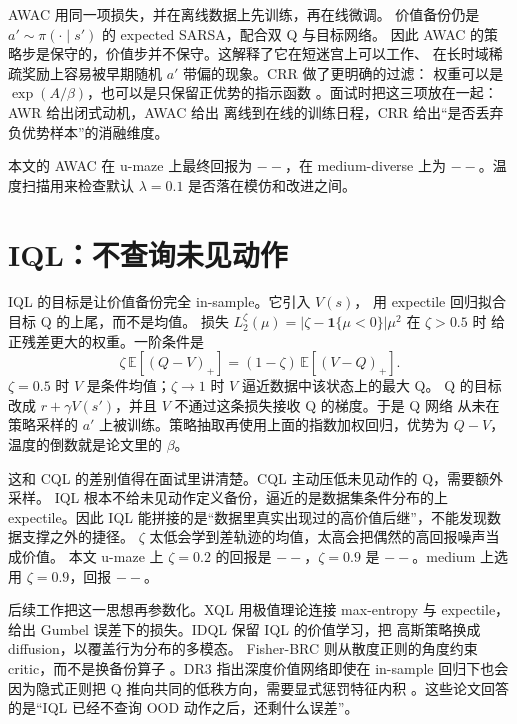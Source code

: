 \documentclass[10pt,twocolumn,a4paper]{ctexart}
\providecommand{\BestZeta}{0.9}
\providecommand{\IqlBestMediumMean}{--}
\providecommand{\AwacUmazeMean}{--}\providecommand{\AwacMediumMean}{--}
\providecommand{\IqlZAJUmazeMean}{--}\providecommand{\IqlZAJMediumMean}{--}
\providecommand{\IqlZACUmazeMean}{--}
\begin{document}
AWAC 用同一项损失，并在离线数据上先训练，再在线微调\citep{nair2020awac}。
价值备份仍是 $a'\sim\pi(\cdot\mid s')$ 的 expected SARSA，配合双 Q 与目标网络。
因此 AWAC 的策略步是保守的，价值步并不保守。这解释了它在短迷宫上可以工作、
在长时域稀疏奖励上容易被早期随机 $a'$ 带偏的现象。CRR 做了更明确的过滤：
权重可以是 $\exp(A/\beta)$，也可以是只保留正优势的指示函数
\citep{wang2020crr}。面试时把这三项放在一起：AWR 给出闭式动机，AWAC 给出
离线到在线的训练日程，CRR 给出“是否丢弃负优势样本”的消融维度。

本文的 AWAC 在 u-maze 上最终回报为 $\AwacUmazeMean$，在 medium-diverse 上为
$\AwacMediumMean$。温度扫描用来检查默认 $\lambda=0.1$ 是否落在模仿和改进之间。

\section{IQL：不查询未见动作}
IQL 的目标是让价值备份完全 in-sample\citep{kostrikov2022iql}。它引入 $V(s)$，
用 expectile 回归拟合目标 Q 的上尾，而不是均值\citep{newey1987expectile}。
损失 $L_2^{\zeta}(\mu)=\lvert\zeta-\mathbf{1}\{\mu<0\}\rvert\mu^{2}$ 在 $\zeta>0.5$ 时
给正残差更大的权重。一阶条件是
\begin{equation}
\zeta\,\mathbb{E}[(Q-V)_{+}]=(1-\zeta)\,\mathbb{E}[(V-Q)_{+}].
\end{equation}
$\zeta=0.5$ 时 $V$ 是条件均值；$\zeta\to 1$ 时 $V$ 逼近数据中该状态上的最大 Q。
Q 的目标改成 $r+\gamma V(s')$，并且 $V$ 不通过这条损失接收 Q 的梯度。于是 Q 网络
从未在策略采样的 $a'$ 上被训练。策略抽取再使用上面的指数加权回归，优势为
$Q-V$，温度的倒数就是论文里的 $\beta$。

这和 CQL 的差别值得在面试里讲清楚。CQL 主动压低未见动作的 Q，需要额外采样。
IQL 根本不给未见动作定义备份，逼近的是数据集条件分布的上 expectile。因此 IQL
能拼接的是“数据里真实出现过的高价值后继”，不能发现数据支撑之外的捷径。
$\zeta$ 太低会学到差轨迹的均值，太高会把偶然的高回报噪声当成价值。
本文 u-maze 上 $\zeta=0.2$ 的回报是 $\IqlZACUmazeMean$，$\zeta=0.9$ 是
$\IqlZAJUmazeMean$。medium 上选用 $\zeta=\BestZeta$，回报 $\IqlBestMediumMean$。

后续工作把这一思想再参数化。XQL 用极值理论连接 max-entropy 与 expectile，
给出 Gumbel 误差下的损失\citep{garg2023xql}。IDQL 保留 IQL 的价值学习，把
高斯策略换成 diffusion，以覆盖行为分布的多模态\citep{hansenestruch2023idql}。
Fisher-BRC 则从散度正则的角度约束 critic，而不是换备份算子
\citep{kostrikov2021fbrc}。DR3 指出深度价值网络即使在 in-sample 回归下也会
因为隐式正则把 Q 推向共同的低秩方向，需要显式惩罚特征内积
\citep{kumar2022dr3}。这些论文回答的是“IQL 已经不查询 OOD 动作之后，还剩什么误差”。
\end{document}
